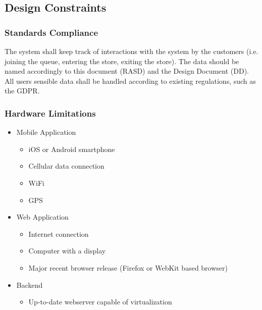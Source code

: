 \subsection{Design Constraints}
\subsubsection{Standards Compliance}
The system shall keep track of interactions with the system by the customers (i.e. joining the queue, entering the store, exiting the store).
The data should be named accordingly to this document (RASD) and the Design Document (DD).
All users sensible data shall be handled according to existing regulations, such as the GDPR.

\subsubsection{Hardware Limitations}
\begin{itemize}
    \item Mobile Application
    \begin{itemize}
        \item iOS or Android smartphone
        \item Cellular data connection
        \item WiFi
        \item GPS
    \end{itemize}
    \item Web Application
    \begin{itemize}
        \item Internet connection
        \item Computer with a display
        \item Major recent browser release (Firefox or WebKit based browser)
    \end{itemize}
    \item Backend
    \begin{itemize}
        \item Up-to-date webserver capable of virtualization
    \end{itemize}
\end{itemize}

